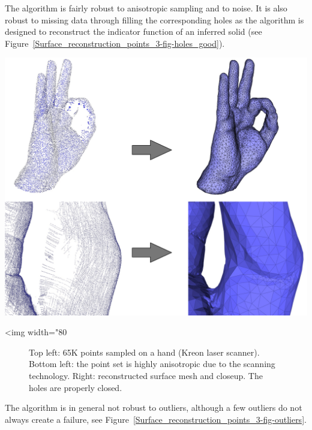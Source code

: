 The algorithm is fairly robust to anisotropic sampling and to noise. It is also robust to missing data through filling the corresponding holes as the algorithm is designed to reconstruct the indicator function of an inferred solid (see Figure~\ref{Surface_reconstruction_points_3-fig-holes_good}).

\begin{center}
    \label{Surface_reconstruction_points_3-fig-holes_good}
    \begin{ccTexOnly}
\includegraphics[width=1.0\textwidth]{Surface_reconstruction_points_3/holes_good}
    \end{ccTexOnly}
    \begin{ccHtmlOnly}
        <img width="80%
    \end{ccHtmlOnly}
    \begin{figure}[h]
        \caption{Top left: 65K points sampled on a hand (Kreon laser scanner).
                 Bottom left: the point set is highly anisotropic due
                 to the scanning technology.
                 Right: reconstructed surface mesh and closeup.
                 The holes are properly closed.}
    \end{figure}
\end{center}

The algorithm is in general not robust to outliers, although a few outliers do not always create a failure, see Figure~\ref{Surface_reconstruction_points_3-fig-outliers}.

